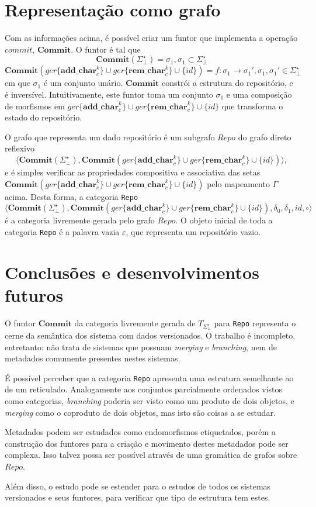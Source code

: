 \documentclass[a4paper]{article}
\newcommand{\co}{{$commit$}}
\newcommand{\baseset}{{\Sigma^\star_\bot}}
\newcommand{\addc}[2]{{\mathbf{add\_char}_{#1}^{#2}}}
\newcommand{\opa}{{\addc{c}{k}}}
\newcommand{\remc}[2]{{\mathbf{rem\_char}_{#1}^{#2}}}
\newcommand{\gopa}{{ger\{\opa\}}}
\newcommand{\opb}{{\remc{c}{k}}}
\newcommand{\gopb}{{ger\{\opb\}}}
\newcommand{\transMon}{{T_\baseset}}
\newcommand{\composition}{{\circ}}
\newcommand{\morun}{{\gopa \cup \gopb \cup \{id\}}}
\newcommand{\commit}{{\mathbf{Commit}}}
\begin{document}


\section*{Representação como grafo}
Com as informações acima, é possível criar um funtor que implementa a operação \co, $\commit$. O funtor é tal que
\begin{equation} \label{fun:set}
\commit(\baseset) = \sigma_1, \sigma_1 \subset \baseset
\end{equation}
\begin{equation} \label{fun:mor}
\commit(\morun) = f:\sigma_1 \to \sigma_1\prime, \sigma_1,\sigma_1\prime \in \baseset
\end{equation}
em que $\sigma_1$ é um conjunto unário. $\commit$ constrói a estrutura do repositório, e é inversível. Intuitivamente, este funtor toma um conjunto $\sigma_1$ e uma composição de morfismos em $\morun$ que transforma o estado do repositório. 

O grafo que representa um dado repositório é um subgrafo $Repo$ do grafo direto reflexivo
\[
\langle \commit(\baseset), \commit(\morun)\rangle,
\]
e é simples verificar as propriedades compositiva e associativa das setas $\commit(\morun)$ pelo mapeamento $\Gamma$ acima. Desta forma, a categoria {\tt Repo} 
 \[
\langle \commit(\baseset), \commit(\morun), \delta_0, \delta_1, id, \composition\rangle
\]
é a categoria livremente gerada pelo grafo $Repo$. O objeto inicial de toda a categoria {\tt Repo} é a palavra vazia $\varepsilon$, que representa um repositório vazio.

\section*{Conclusões e desenvolvimentos futuros}
O funtor $\commit$ da categoria livremente gerada de $\transMon$ para {\tt Repo} representa o cerne da semântica dos sistema com dados versionados. O trabalho é incompleto, entretanto: não trata de sistemas que possuam {\it merging} e {\it branching}, nem de metadados comumente presentes nestes sistemas.

É possível perceber que a categoria {\tt Repo} apresenta uma estrutura semelhante ao de um reticulado. Analogamente aos conjuntos parcialmente ordenados vistos como categorias, {\it branching} poderia ser visto como um produto de dois objetos, e {\it merging} como o coproduto de dois objetos, mas isto são coisas a se estudar.

Metadados podem ser estudados como endomorfismos etiquetados, porém a construção dos funtores para a criação e movimento destes metadados pode ser complexa. Isso talvez possa ser possível através de uma gramática de grafos sobre $Repo$.

Além disso, o estudo pode se estender para o estudos de todos os sistemas versionados e seus funtores, para verificar que tipo de estrutura tem estes.
\end{document}
